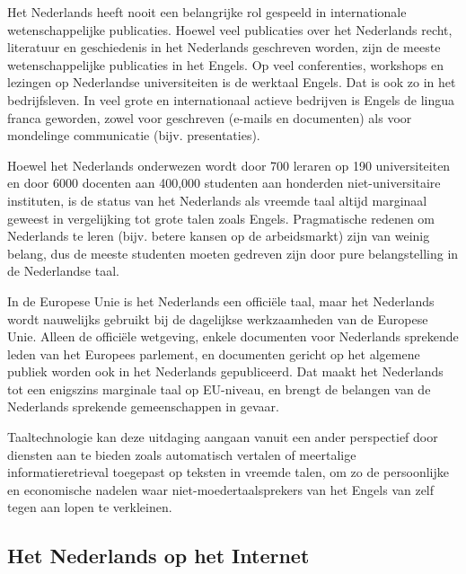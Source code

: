 \begin{multicols}{2}
    Het Nederlands heeft nooit een belangrijke rol gespeeld in internationale wetenschappelijke publicaties. Hoewel veel publicaties over het Nederlands recht, literatuur en geschiedenis in het Nederlands geschreven worden, zijn de meeste wetenschappelijke publicaties in het Engels. Op veel conferenties, workshops en lezingen op Nederlandse universiteiten is de werktaal Engels. Dat is ook zo in het bedrijfsleven. In veel grote en internationaal actieve bedrijven is Engels de lingua franca geworden, zowel voor geschreven (e-mails en documenten) als voor mondelinge communicatie (bijv. presentaties).


    Hoewel het Nederlands onderwezen wordt door 700 leraren op 190 universiteiten en door 6000 docenten aan 400,000 studenten aan honderden niet-universitaire instituten, is de status van het Nederlands als vreemde taal altijd marginaal geweest in vergelijking tot grote talen zoals Engels. Pragmatische redenen om Nederlands te leren (bijv. betere kansen op de arbeidsmarkt) zijn van weinig belang, dus de meeste studenten moeten gedreven zijn door pure belangstelling in de Nederlandse taal.

    In de Europese Unie is het Nederlands een offici{\"e}le taal, maar het Nederlands wordt nauwelijks gebruikt bij de dagelijkse werkzaamheden van de Europese Unie. Alleen de offici{\"e}le wetgeving, enkele documenten voor Nederlands sprekende leden van het Europees parlement, en documenten gericht op het algemene publiek worden ook in het Nederlands gepubliceerd. Dat maakt het Nederlands tot een enigszins marginale taal op EU-niveau, en brengt de belangen van de Nederlands sprekende gemeenschappen in gevaar.

    Taaltechnologie kan deze uitdaging aangaan vanuit een ander perspectief door diensten aan te bieden zoals automatisch vertalen of meertalige informatieretrieval toegepast op teksten in vreemde talen, om zo de persoonlijke en economische nadelen waar niet-moedertaalsprekers van het Engels van zelf tegen aan lopen te verkleinen.

\subsection{Het Nederlands op het Internet}


\end{multicols}
